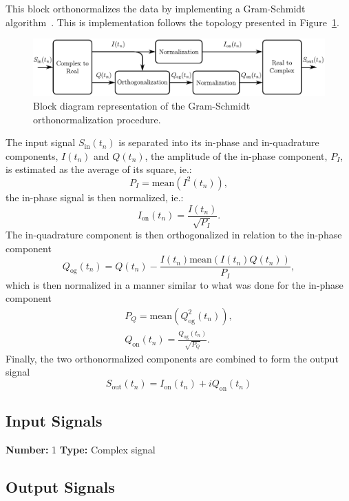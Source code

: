 \begin{refsection}
This block orthonormalizes the data by implementing a Gram-Schmidt algorithm~\cite{arfken99}. This is implementation follows the topology presented in Figure~\ref{fig:orthonormalizationDiagram}.
%
\begin{figure}[h]
\centering
\includegraphics[width=\linewidth]{./lib/orthonormalization/figures/diagramDSP_GS}
\caption{Block diagram representation of the Gram-Schmidt orthonormalization procedure.}
\label{fig:orthonormalizationDiagram}
\end{figure}
%
The input signal $S_\text{in}(t_n)$ is separated into its in-phase and in-quadrature components, $I(t_n)$ and $Q(t_n)$, the amplitude of the in-phase component, $P_I$, is estimated as the average of its square, ie.:
\begin{equation}
P_I=\text{mean}(I^2(t_n)),
\end{equation}
the in-phase signal is then normalized, ie.:
\begin{equation}
I_\text{on}(t_n)=\frac{I(t_n)}{\sqrt{P_I}}.
\end{equation}
The in-quadrature component is then orthogonalized in relation to the in-phase component
\begin{equation}
Q_\text{og}(t_n)=Q(t_n)-\frac{I(t_n)\text{mean}(I(t_n)Q(t_n))}{P_I},
\end{equation}
which is then normalized in a manner similar to what was done for the in-phase component
\begin{align}
P_Q=\text{mean}(Q_\text{og}^2(t_n)),\\
Q_\text{on}(t_n)=\frac{Q_\text{og}(t_n)}{\sqrt{P_Q}}.
\end{align}
Finally, the two orthonormalized components are combined to form the output signal
\begin{equation}
S_\text{out}(t_n)=I_\text{on}(t_n)+iQ_\text{on}(t_n)
\end{equation}

\subsection*{Input Signals}

\textbf{Number:} 1
\textbf{Type:} Complex signal

\subsection*{Output Signals}


\end{refsection}
